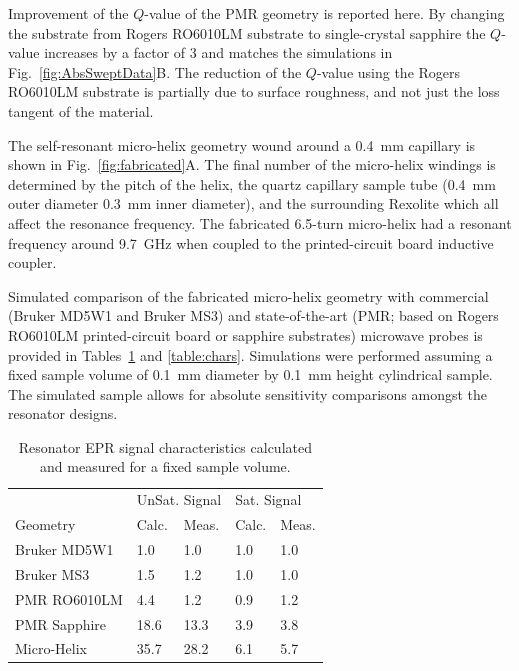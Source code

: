 Improvement of the $Q$-value of the PMR geometry is reported here. By changing the substrate from Rogers RO6010LM substrate to single-crystal sapphire the $Q$-value increases by a factor of 3 and matches the simulations in Fig.~\ref{fig:AbsSweptData}B. The reduction of the $Q$-value using the Rogers RO6010LM substrate is partially due to surface roughness, and not just the loss tangent of the material.

The self-resonant micro-helix geometry wound around a 0.4~mm capillary is shown in Fig.~\ref{fig:fabricated}A. The final number of the micro-helix windings is determined by the pitch of the helix, the quartz capillary sample tube (0.4~mm outer diameter 0.3~mm inner diameter), and the surrounding Rexolite which all affect the resonance frequency. The fabricated 6.5-turn micro-helix had a resonant frequency around 9.7~GHz when coupled to the printed-circuit board inductive coupler. 

Simulated comparison of the fabricated micro-helix geometry with commercial (Bruker MD5W1 and Bruker MS3) and state-of-the-art (PMR; based on Rogers RO6010LM printed-circuit board or sapphire substrates) microwave probes is provided in Tables~\ref{table:signal} and \ref{table:chars}. Simulations were performed assuming a fixed sample volume of 0.1~mm diameter by 0.1~mm height cylindrical sample. The simulated sample allows for absolute sensitivity comparisons amongst the resonator designs. 

\begin{table}[htb]
\centering
\caption[Resonator EPR signal characteristics calculated and measured.]{Resonator EPR signal characteristics calculated and measured for a fixed sample volume.}
\label{table:signal}
\begin{tabular}{l|l|l|l|l}
 & \multicolumn{2}{l|}{UnSat. Signal} & \multicolumn{2}{l}{Sat. Signal}\\
Geometry & Calc. & Meas. & Calc. & Meas.\\ \hline \hline
Bruker MD5W1 & 1.0 & 1.0 & 1.0 & 1.0 \\ \hline
Bruker MS3 & 1.5 & 1.2 & 1.0 & 1.0 \\ \hline
PMR RO6010LM & 4.4 & 1.2 & 0.9 & 1.2 \\ \hline
PMR Sapphire & 18.6 & 13.3 & 3.9 & 3.8 \\ \hline
Micro-Helix & 35.7 & 28.2 & 6.1 & 5.7 \\
\end{tabular}
\end{table}

